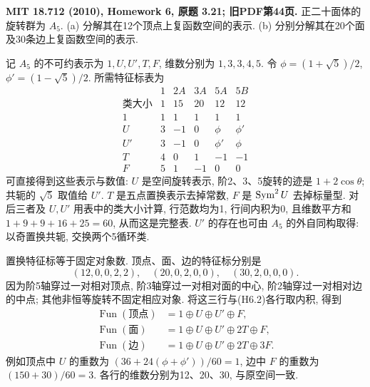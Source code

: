 \begin{exercise}\label{hw:3.21}
\textbf{MIT 18.712 (2010), Homework 6, 原题 3.21; 旧PDF第44页.}
正二十面体的旋转群为 $A_5$.
(a) 分解其在12个顶点上复函数空间的表示.
(b) 分别分解其在20个面及30条边上复函数空间的表示.
\end{exercise}
\begin{solution}
记 $A_5$ 的不可约表示为 $1,U,U',T,F$, 维数分别为 $1,3,3,4,5$. 令 $\phi=(1+\sqrt5)/2$, $\phi'=(1-\sqrt5)/2$. 所需特征标表为
\[
\begin{array}{c|rrrrr}
 &1&2A&3A&5A&5B\\ \hline
\text{类大小}&1&15&20&12&12\\
1&1&1&1&1&1\\
U&3&-1&0&\phi&\phi'\\
U'&3&-1&0&\phi'&\phi\\
T&4&0&1&-1&-1\\
F&5&1&-1&0&0
\end{array}                                                     \tag{H6.2}
\]
可直接得到这些表示与数值: $U$ 是空间旋转表示, 阶2、3、5旋转的迹是 $1+2\cos\theta$; 共轭的 $\sqrt5$ 取值给 $U'$. $T$ 是五点置换表示去掉常数, $F$ 是 $\operatorname{Sym}^2U$ 去掉标量型. 对后三者及 $U,U'$ 用表中的类大小计算, 行范数均为1, 行间内积为0, 且维数平方和 $1+9+9+16+25=60$, 从而这是完整表. $U'$ 的存在也可由 $A_5$ 的外自同构取得: 以奇置换共轭, 交换两个5循环类.

置换特征标等于固定对象数. 顶点、面、边的特征标分别是
\[
 (12,0,0,2,2),\quad (20,0,2,0,0),\quad (30,2,0,0,0).
\]
因为阶5轴穿过一对相对顶点, 阶3轴穿过一对相对面的中心, 阶2轴穿过一对相对边的中点; 其他非恒等旋转不固定相应对象. 将这三行与(H6.2)各行取内积, 得到
\[
\begin{aligned}
 \operatorname{Fun}(\text{顶点})&=1\oplus U\oplus U'\oplus F,\\
 \operatorname{Fun}(\text{面})&=1\oplus U\oplus U'\oplus2T\oplus F,\\
 \operatorname{Fun}(\text{边})&=1\oplus U\oplus U'\oplus2T\oplus3F.
\end{aligned}
\]
例如顶点中 $U$ 的重数为 $(36+24(\phi+\phi'))/60=1$, 边中 $F$ 的重数为 $(150+30)/60=3$. 各行的维数分别为12、20、30, 与原空间一致.
\end{solution}

